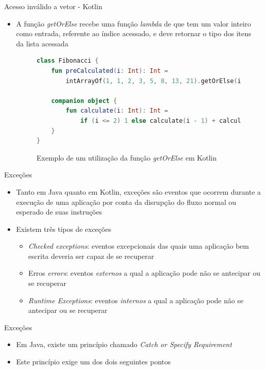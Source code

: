 \documentclass[brazilian]{beamer}
\begin{document}
\begin{frame}[fragile]{Acesso inválido a vetor - Kotlin}
    \begin{itemize}
        \item A função \emph{getOrElse} recebe uma função \textit{lambda} de que 
        tem um valor inteiro como entrada, referente ao índice acessado, e deve retornar o tipo dos itens da lista acessada
        \begin{figure}[H]
            \centering
            \begin{lstlisting}[language=Kotlin]
class Fibonacci {
    fun preCalculated(i: Int): Int = 
        intArrayOf(1, 1, 2, 3, 5, 8, 13, 21).getOrElse(i) { calculate(it) }

    companion object {
        fun calculate(i: Int): Int = 
            if (i <= 2) 1 else calculate(i - 1) + calculate(i - 2)
    }
}
            \end{lstlisting}
            \caption{Exemplo de um utilização da função \textit{getOrElse} em Kotlin}
            \label{fig:kotlin_get_or_else_array_access}
        \end{figure}
    \end{itemize}
\end{frame}

\begin{frame}{Exceções}
    \begin{itemize}
        \item Tanto em Java quanto em Kotlin, exceções são eventos que ocorrem durante a execução de uma aplicação por conta da disrupção do fluxo normal ou esperado de suas instruções
        \item Existem três tipos de exceções
        \begin{itemize}
            \item \textit{Checked exceptions}: eventos excepcionais das quais uma aplicação bem escrita deveria ser capaz de se recuperar
            \item Erros \textit{errors}: eventos \emph{externos} a qual a aplicação pode não se antecipar ou se recuperar
            \item \textit{Runtime Exceptions}: eventos \emph{internos} a qual a aplicação pode não se antecipar ou se recuperar
        \end{itemize}
    \end{itemize}
\end{frame}

\begin{frame}{Exceções}
    \begin{itemize}
        \item Em Java, existe um princípio chamado \textit{Catch or Specify Requirement}
        \item Este princípio exige um dos dois seguintes pontos
    \end{itemize}
\end{frame}
\end{document}

